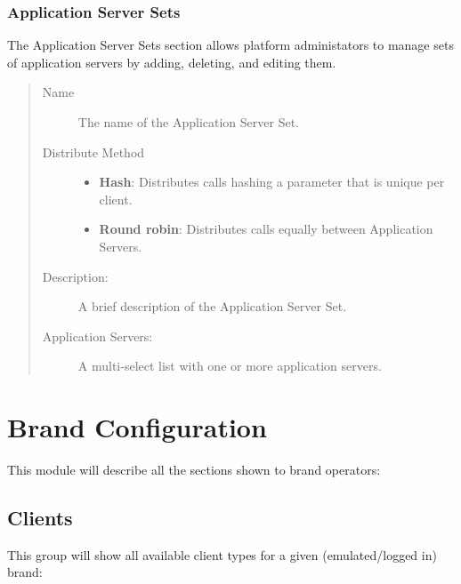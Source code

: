 \documentclass[letterpaper,10pt,english]{sphinxmanual}
\begin{document}
\subsection{Application Server Sets}
\label{administration_portal/platform/infrastructure/application_server_sets:application-server-sets}\label{administration_portal/platform/infrastructure/application_server_sets::doc}
The Application Server Sets section allows platform administators to manage sets of application servers by adding, deleting, and editing them.
\begin{quote}
\begin{description}
\item[{Name}] \leavevmode
The name of the Application Server Set.

\item[{Distribute Method}] \leavevmode\begin{itemize}
\item {} 
\textbf{Hash}: Distributes calls hashing a parameter that is unique per client.

\item {} 
\textbf{Round robin}: Distributes calls equally between Application Servers.

\end{itemize}

\item[{Description:}] \leavevmode
A brief description of the Application Server Set.

\item[{Application Servers:}] \leavevmode
A multi-select list with one or more application servers.

\end{description}
\end{quote}


\chapter{Brand Configuration}
\label{administration_portal/brand/index::doc}\label{administration_portal/brand/index:brand-configuration}
This module will describe all the sections shown to brand operators:


\section{Clients}
\label{administration_portal/brand/clients/index:clients}\label{administration_portal/brand/clients/index::doc}
This group will show all available client types for a given (emulated/logged in) brand:
\end{document}
